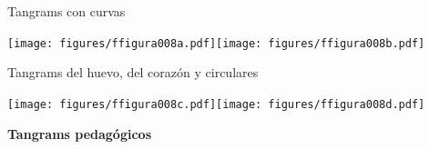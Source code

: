 \documentclass[14pt,aspectratio=169,usenames,dvipsnames]{beamer}
\begin{document}

    \begin{frame}{Tangrams con curvas}
        \begin{center}
            \texttt{[image: figures/ffigura008a.pdf]}\qquad\qquad\texttt{[image: figures/ffigura008b.pdf]}\\

            \medskip

            Tangrams del huevo, del corazón y circulares

            \bigskip

            \texttt{[image: figures/ffigura008c.pdf]}\qquad\qquad\texttt{[image: figures/ffigura008d.pdf]} \\
        \end{center}
    \end{frame}


    \begin{frame}{}
        \begin{center}
            \textbf{\huge Tangrams pedagógicos}
        \end{center}
    \end{frame}



\end{document}
